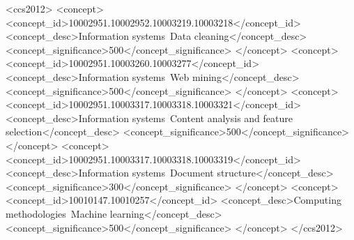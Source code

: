 \documentclass[sigconf,10pt]{acmart}
\begin{document}
%
%
\begin{CCSXML}
<ccs2012>
<concept>
<concept_id>10002951.10002952.10003219.10003218</concept_id>
<concept_desc>Information systems~Data cleaning</concept_desc>
<concept_significance>500</concept_significance>
</concept>
<concept>
<concept_id>10002951.10003260.10003277</concept_id>
<concept_desc>Information systems~Web mining</concept_desc>
<concept_significance>500</concept_significance>
</concept>
<concept>
<concept_id>10002951.10003317.10003318.10003321</concept_id>
<concept_desc>Information systems~Content analysis and feature selection</concept_desc>
<concept_significance>500</concept_significance>
</concept>
<concept>
<concept_id>10002951.10003317.10003318.10003319</concept_id>
<concept_desc>Information systems~Document structure</concept_desc>
<concept_significance>300</concept_significance>
</concept>
<concept>
<concept_id>10010147.10010257</concept_id>
<concept_desc>Computing methodologies~Machine learning</concept_desc>
<concept_significance>500</concept_significance>
</concept>
</ccs2012>
\end{CCSXML}



\maketitle




 
\end{document}
